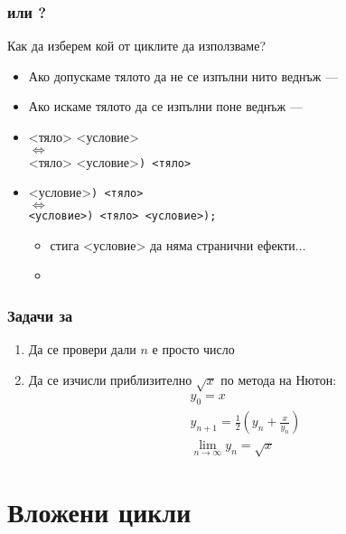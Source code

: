 \documentclass{beamer}
\begin{document}
\begin{frame}
  \frametitle{ или ?}

  Как да изберем кой от циклите да използваме?
  \begin{itemize}[<+->]
  \item Ако допускаме тялото да не се изпълни нито веднъж --- 
  \item Ако искаме тялото да се изпълни поне веднъж --- 
  \item {} <тяло> <условие>\lst{);}\\
    $\Leftrightarrow$\\
    <тяло> <условие>\tt) <тяло>
  \item {}<условие>\tt) <тяло>\\
    $\Leftrightarrow$\\
    <условие>\tt) <тяло> <условие>\tt{);}
    \begin{itemize}
    \item \alert{стига <условие> да няма странични ефекти...}
    \item \exa {}
    \end{itemize}
  \end{itemize}
\end{frame}

\begin{frame}
  \frametitle{Задачи за }

  \begin{enumerate}[<+->]
  \item Да се провери дали $n$ е просто число
  \item Да се изчисли приблизително $\sqrt x$ по метода на Нютон:
    \begin{equation*}
      \begin{array}{l}
      y_0 = x\\
      y_{n+1} = \frac12\left(y_n + \frac x{y_n}\right)\\
      \lim_{n\to\infty}\limits y_n = \sqrt x
      \end{array}
    \end{equation*}
  \end{enumerate}
\end{frame}

\section{Вложени цикли}
\end{document}
